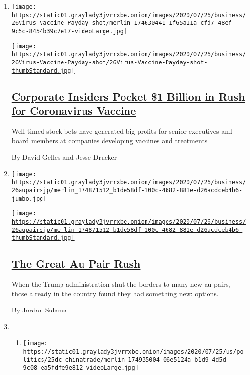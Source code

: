 \begin{enumerate}
\def\labelenumi{\arabic{enumi}.}
\item
  \texttt{[image: https://static01.graylady3jvrrxbe.onion/images/2020/07/26/business/26Virus-Vaccine-Payday-shot/merlin\_174630441\_1f65a11a-cfd7-48ef-9c5c-8454b39c7e17-videoLarge.jpg]}

  \href{/2020/07/25/business/coronavirus-vaccine-profits-vaxart.html}{\texttt{[image: https://static01.graylady3jvrrxbe.onion/images/2020/07/26/business/26Virus-Vaccine-Payday-shot/26Virus-Vaccine-Payday-shot-thumbStandard.jpg]}}

  \hypertarget{corporate-insiders-pocket-1-billion-in-rush-for-coronavirus-vaccine}{%
  \subsection{\texorpdfstring{\href{/2020/07/25/business/coronavirus-vaccine-profits-vaxart.html}{Corporate
  Insiders Pocket \$1 Billion in Rush for Coronavirus
  Vaccine}}{Corporate Insiders Pocket \$1 Billion in Rush for Coronavirus Vaccine}}\label{corporate-insiders-pocket-1-billion-in-rush-for-coronavirus-vaccine}}

  Well-timed stock bets have generated big profits for senior executives
  and board members at companies developing vaccines and treatments.

  By David Gelles and Jesse Drucker
\item
  \texttt{[image: https://static01.graylady3jvrrxbe.onion/images/2020/07/26/business/26aupairsjp/merlin\_174871512\_b1de58df-100c-4682-881e-d26acdceb4b6-jumbo.jpg]}

  \href{/2020/07/25/business/the-great-au-pair-rush.html}{\texttt{[image: https://static01.graylady3jvrrxbe.onion/images/2020/07/26/business/26aupairsjp/merlin\_174871512\_b1de58df-100c-4682-881e-d26acdceb4b6-thumbStandard.jpg]}}

  \hypertarget{the-great-au-pair-rush}{%
  \subsection{\texorpdfstring{\href{/2020/07/25/business/the-great-au-pair-rush.html}{The
  Great Au Pair
  Rush}}{The Great Au Pair Rush}}\label{the-great-au-pair-rush}}

  When the Trump administration shut the borders to many new au pairs,
  those already in the country found they had something new: options.

  By Jordan Salama
\item
  \begin{enumerate}
  \def\labelenumii{\arabic{enumii}.}
  \item
    \texttt{[image: https://static01.graylady3jvrrxbe.onion/images/2020/07/25/us/politics/25dc-chinatrade/merlin\_174935004\_06e5124a-b1d9-4d5d-9c08-ea5fdfe9e812-videoLarge.jpg]}


\end{enumerate}
\end{enumerate}
